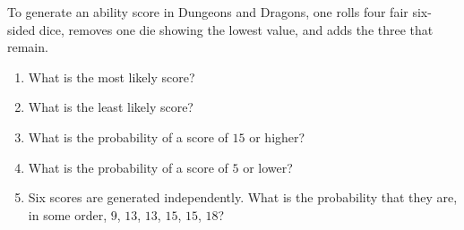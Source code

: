To generate an ability score in Dungeons and Dragons, one rolls four fair six-sided dice, removes one die showing the lowest value, and adds the three that remain.
\begin{enumerate}
\item What is the most likely score?
\item What is the least likely score?
\item What is the probability of a score of $15$ or higher?
\item What is the probability of a score of $5$ or lower?
\item Six scores are generated independently. What is the probability that they are, in some order, $9$, $13$, $13$, $15$, $15$, $18$?
\end{enumerate}
